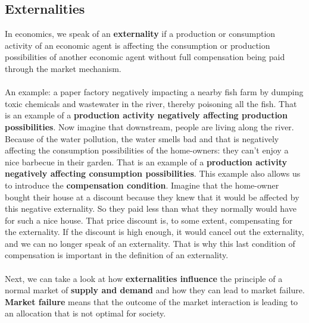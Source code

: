 \documentclass[../summary.tex]{subfiles}
\begin{document}
\newpage
\subsection{Externalities}

In economics, we speak of an \textbf{externality} if a production or consumption activity of an economic agent is affecting the consumption or production possibilities of another economic agent without full compensation being paid through the market mechanism.
\\\\
An example: a paper factory negatively impacting a nearby fish farm by dumping toxic chemicals and wastewater in the river, thereby poisoning all the fish. That is an example of a \textbf{production activity negatively affecting production possibilities}. Now imagine that downstream, people are living along the river. Because of the water pollution, the water smells bad and that is negatively affecting the consumption possibilities of the home-owners: they can't enjoy a nice barbecue in their garden. That is an example of a \textbf{production activity negatively affecting consumption possibilities}. This example also allows us to introduce the \textbf{compensation condition}. Imagine that the home-owner bought their house at a discount because they knew that it would be affected by this negative externality. So they paid less than what they normally would have for such a nice house. That price discount is, to some extent, compensating for the externality. If the discount is high enough, it would cancel out the externality, and we can no longer speak of an externality. That is why this last condition of compensation is important in the definition of an externality.
\\\\
Next, we can take a look at how \textbf{externalities influence} the principle of a normal market of \textbf{supply and demand} and how they can lead to market failure. \textbf{Market failure} means that the outcome of the market interaction is leading to an allocation that is not optimal for society.
\\\\
\end{document}

